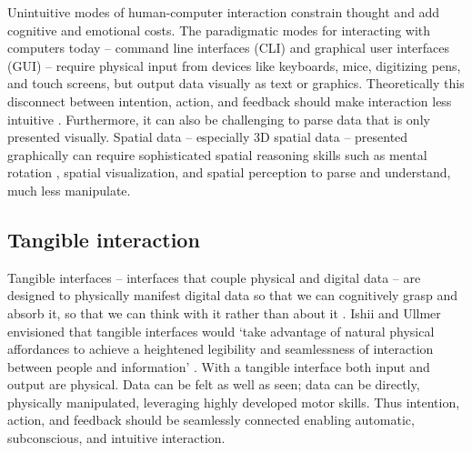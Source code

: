 \documentclass[prodmode,acmtochi]{acmsmall} %
\begin{document}
Unintuitive modes of human-computer interaction constrain thought and add cognitive and emotional costs. 
%
The paradigmatic modes for interacting with computers today 
-- command line interfaces (CLI) and
graphical user interfaces (GUI)
 -- 
require physical input from devices like keyboards, mice, digitizing pens, and touch screens, but
output %
data visually as text or graphics. 
%
Theoretically this disconnect between intention, action, and feedback should make interaction less intuitive \cite{Dourish2001,Ishii2008}. 
%
Furthermore, it can also be challenging to parse data that is only presented visually. 
Spatial data -- especially 3D spatial data -- presented graphically can require sophisticated spatial reasoning skills such as mental rotation \cite{Shepard1971}, spatial visualization, and spatial perception \cite{Linn1985} to parse and understand, much less manipulate. 

\subsection{Tangible interaction}
Tangible interfaces -- interfaces that couple physical and digital data \cite{Dourish2001} -- 
are designed to physically manifest digital data so that we can cognitively grasp and absorb it,
so that we can think with it rather than about it \cite{Kirsh2013}. 
%
Ishii and Ullmer envisioned that tangible interfaces would  `take advantage of natural physical affordances to achieve a heightened legibility and seamlessness of interaction between people and information' \cite{Ishii1997}. 
%
With a tangible interface both input and output are physical. 
%
Data can be felt as well as seen; data can be directly, physically manipulated, leveraging highly developed motor skills. 
%
Thus intention, action, and feedback should be seamlessly connected 
enabling automatic, subconscious, and intuitive interaction.
\end{document}
